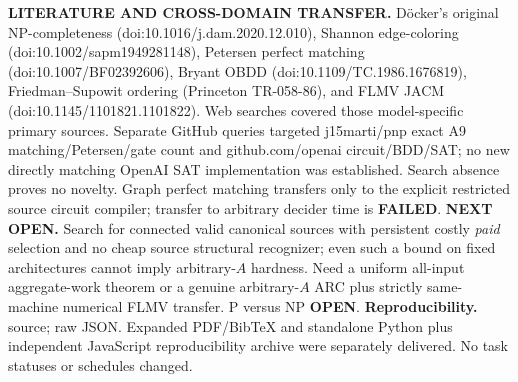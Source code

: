 \documentclass[11pt]{article}
\begin{document}
\noindent\textbf{LITERATURE AND CROSS-DOMAIN TRANSFER.} D\"ocker's original NP-completeness (doi:10.1016/j.dam.2020.12.010), Shannon edge-coloring (doi:10.1002/sapm1949281148), Petersen perfect matching (doi:10.1007/BF02392606), Bryant OBDD (doi:10.1109/TC.1986.1676819), Friedman--Supowit ordering (Princeton TR-058-86), and FLMV JACM (doi:10.1145/1101821.1101822). Web searches covered those model-specific primary sources. Separate GitHub queries targeted j15marti/pnp exact A9 matching/Petersen/gate count and github.com/openai circuit/BDD/SAT; no new directly matching OpenAI SAT implementation was established. Search absence proves no novelty. Graph perfect matching transfers only to the explicit restricted source circuit compiler; transfer to arbitrary decider time is \textbf{FAILED}.
\noindent\textbf{NEXT OPEN.} Search for connected valid canonical sources with persistent costly \emph{paid} selection and no cheap source structural recognizer; even such a bound on fixed architectures cannot imply arbitrary-$A$ hardness. Need a uniform all-input aggregate-work theorem or a genuine arbitrary-$A$ ARC plus strictly same-machine numerical FLMV transfer. P versus NP \textbf{OPEN}.
\noindent\textbf{Reproducibility.}  source;  raw JSON. Expanded PDF/BibTeX and standalone Python plus independent JavaScript reproducibility archive were separately delivered. No task statuses or schedules changed.
\end{document}
